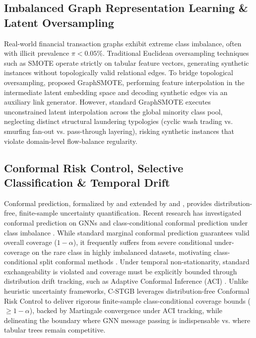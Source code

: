 \subsection{Imbalanced Graph Representation Learning \& Latent Oversampling}
\label{sec:related_imbalance}
Real-world financial transaction graphs exhibit extreme class imbalance, often with illicit prevalence $\pi < 0.05\%$. Traditional Euclidean oversampling techniques such as SMOTE \citep{chawla2002smote} operate strictly on tabular feature vectors, generating synthetic instances without topologically valid relational edges. To bridge topological oversampling, \citet{zhao2021graphsmote} proposed GraphSMOTE, performing feature interpolation in the intermediate latent embedding space and decoding synthetic edges via an auxiliary link generator. However, standard GraphSMOTE executes unconstrained latent interpolation across the global minority class pool, neglecting distinct structural laundering typologies (cyclic wash trading vs. smurfing fan-out vs. pass-through layering), risking synthetic instances that violate domain-level flow-balance regularity.

\subsection{Conformal Risk Control, Selective Classification \& Temporal Drift}
\label{sec:related_conformal}
Conformal prediction, formalized by \citet{vovk2005algorithmic} and extended by \citet{bates2021distribution} and \citet{angelopoulos2021gentle}, provides distribution-free, finite-sample uncertainty quantification. Recent research has investigated conformal prediction on GNNs \citep{huang2024conformal} and class-conditional conformal prediction under class imbalance \citep{ding2023class}. While standard marginal conformal prediction guarantees valid overall coverage ($1-\alpha$), it frequently suffers from severe conditional under-coverage on the rare class in highly imbalanced datasets, motivating class-conditional split conformal methods \citep{sadinle2019least}. Under temporal non-stationarity, standard exchangeability is violated and coverage must be explicitly bounded through distribution drift tracking, such as Adaptive Conformal Inference (ACI) \citep{gibbs2021adaptive}. Unlike heuristic uncertainty frameworks, C-STGB leverages distribution-free Conformal Risk Control to deliver rigorous finite-sample class-conditional coverage bounds ($\ge 1 - \alpha$), backed by Martingale convergence under ACI tracking, while delineating the boundary where GNN message passing is indispensable vs. where tabular trees remain competitive.
